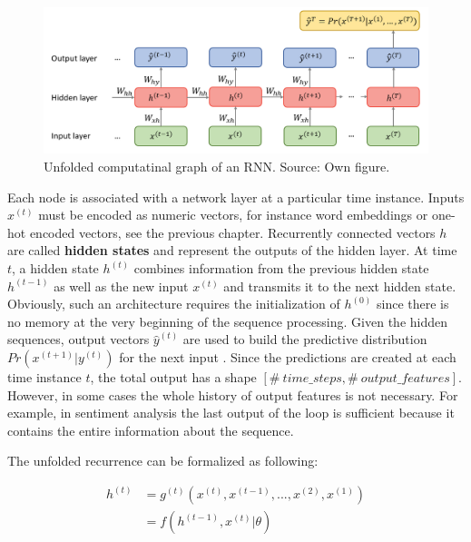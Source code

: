 \documentclass[]{krantz}
\begin{document}
\begin{figure}

{\centering \includegraphics[width=1\linewidth]{figures/01-02-rnns-and-their-applications-in-nlp/1_unfolded_graph} 

}

\caption{Unfolded computatinal graph of an RNN. Source: Own figure.}\label{fig:01-02-unfold}
\end{figure}

Each node is associated with a network layer at a particular time instance. Inputs \(x^{(t)}\) must be encoded as numeric vectors, for instance word embeddings or one-hot encoded vectors, see the previous chapter. Recurrently connected vectors \(h\) are called \textbf{hidden states} and represent the outputs of the hidden layer. At time \(t\), a hidden state \(h^{(t)}\) combines information from the previous hidden state \(h^{(t-1)}\) as well as the new input \(x^{(t)}\) and transmits it to the next hidden state. Obviously, such an architecture requires the initialization of \(h^{(0)}\) since there is no memory at the very beginning of the sequence processing. Given the hidden sequences, output vectors \(\hat{y}^{(t)}\) are used to build the predictive distribution \(Pr(x^{(t+1)}|y^{(t)})\) for the next input \citep{graves2013generating}. Since the predictions are created at each time instance \(t\), the total output has a shape \([\#\ time\_steps, \#\ output\_features]\). However, in some cases the whole history of output features is not necessary. For example, in sentiment analysis the last output of the loop is sufficient because it contains the entire information about the sequence. \citep{chollet2018deep}

The unfolded recurrence can be formalized as following:

\begin{align}
h^{(t)} & = g^{(t)}(x^{(t)},x^{(t-1)},...,x^{(2)}, x^{(1)}) \\
& = f(h^{(t-1)},x^{(t)}| \theta)  \label{eq:recurrent}
\end{align}
\end{document}
